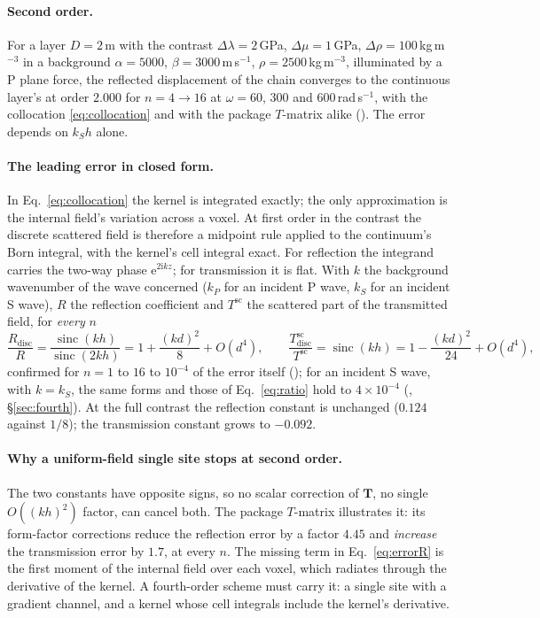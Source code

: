 \documentclass[extra,mreferee]{gji}
\newcommand{\bT}{\mathbf{T}}
\newcommand{\sinc}{\operatorname{sinc}}
\begin{document}
\paragraph{Second order.} For a layer $D=2$\,m with the contrast
$\Delta\lambda=2$\,GPa, $\Delta\mu=1$\,GPa, $\Delta\rho=100$\,kg\,m$^{-3}$ in a background
$\alpha=5000$, $\beta=3000$\,m\,s$^{-1}$, $\rho=2500$\,kg\,m$^{-3}$, illuminated by a P plane force,
the reflected displacement of the chain converges to the continuous layer's at order $2.000$ for
$n=4\to16$ at $\omega=60$, $300$ and $600$\,rad\,s$^{-1}$, with the collocation
\eqref{eq:collocation} and with the package $T$-matrix alike (). The
error depends on $k_Sh$ alone.

\paragraph{The leading error in closed form.} In Eq.~\eqref{eq:collocation} the kernel is
integrated exactly; the only approximation is the internal field's variation across a voxel. At
first order in the contrast the discrete scattered field is therefore a midpoint rule applied to
the continuum's Born integral, with the kernel's cell integral exact. For reflection the integrand
carries the two-way phase $\mathrm{e}^{2\mathrm{i}kz}$; for transmission it is flat. With $k$ the background
wavenumber of the wave concerned ($k_P$ for an incident P wave, $k_S$ for an incident S wave), $R$ the reflection coefficient and $T^{\text{sc}}$ the
scattered part of the transmitted field, for \emph{every} $n$
\begin{equation}\label{eq:errorR}
  \frac{R_{\text{disc}}}{R}=\frac{\sinc(kh)}{\sinc(2kh)}=1+\frac{(kd)^2}{8}+O(d^4),
  \qquad
  \frac{T^{\text{sc}}_{\text{disc}}}{T^{\text{sc}}}=\sinc(kh)=1-\frac{(kd)^2}{24}+O(d^4),
\end{equation}
confirmed for $n=1$ to $16$ to $10^{-4}$ of the error itself
(); for an incident S wave, with $k=k_S$, the same forms and those of
Eq.~\eqref{eq:ratio} hold to $4\times10^{-4}$ (, \S\ref{sec:fourth}). At the full contrast the reflection constant is unchanged
($0.124$ against $1/8$); the transmission constant grows to $-0.092$.

\paragraph{Why a uniform-field single site stops at second order.} The two constants have opposite
signs, so no scalar correction of $\bT$, no single $O((kh)^2)$ factor, can cancel both. The
package $T$-matrix illustrates it: its form-factor corrections reduce the reflection error by a
factor $4.45$ and \emph{increase} the transmission error by $1.7$, at every $n$. The missing term in
Eq.~\eqref{eq:errorR} is the first moment of the internal field over each voxel, which radiates
through the derivative of the kernel. A fourth-order scheme must carry it: a single site with a
gradient channel, and a kernel whose cell integrals include the kernel's derivative.
\end{document}
